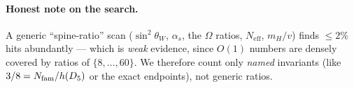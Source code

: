 \paragraph{Honest note on the search.} A generic ``spine-ratio'' scan ($\sin^2\theta_W$, $\alpha_s$, the
$\Omega$ ratios, $N_{\mathrm{eff}}$, $m_H/v$) finds $\le2\%$ hits abundantly --- which is \emph{weak}
evidence, since $O(1)$ numbers are densely covered by ratios of $\{8,\dots,60\}$. We therefore count only
\emph{named} invariants (like $3/8=N_{\mathrm{fam}}/h(D_5)$ or the exact endpoints), not generic ratios.

